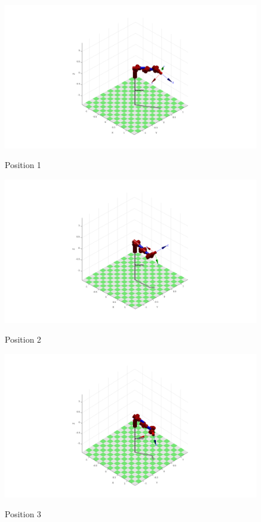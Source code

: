 \documentclass{../lab}
\begin{document}
\begin{task}
  \begin{figure}[H]
    \centering
    \includegraphics[scale=.3]{task1-1.png}
    \label{Pos1}
    \caption{Position 1}
  \end{figure}

  \begin{figure}[H]
    \centering
    \includegraphics[scale=.3]{task1-2.png}
    \label{Pos2}
    \caption{Position 2}
  \end{figure}

  \begin{figure}[H]
    \centering
    \includegraphics[scale=.3]{task1-3.png}
    \label{Pos3}
    \caption{Position 3}
  \end{figure}


\end{task}
\end{document}
